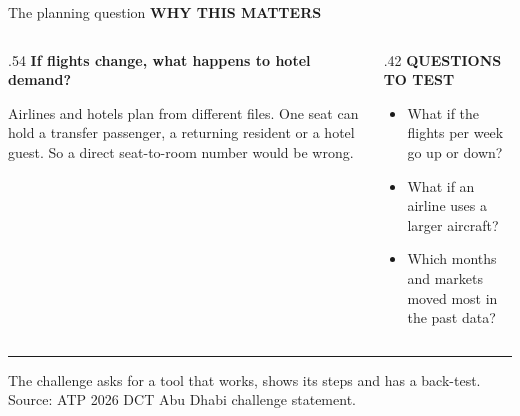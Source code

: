 \documentclass[aspectratio=169,10pt]{beamer}
\newcommand{\kicker}[1]{{\color{Accent}\scriptsize\bfseries\MakeUppercase{#1}}\par\vspace{.16cm}}
\newcommand{\smallnote}[1]{{\color{Muted}\scriptsize #1}}
\begin{document}
\begin{frame}{The planning question}
  \kicker{Why this matters}
  \begin{columns}[T,totalwidth=\linewidth]
    \begin{column}{.54\linewidth}
      {\fontsize{21}{24}\selectfont\bfseries If flights change, what happens to hotel demand?}\par\vspace{.20cm}
      Airlines and hotels plan from different files. One seat can hold a transfer passenger, a returning resident or a hotel guest. So a direct seat-to-room number would be wrong.
    \end{column}
    \begin{column}{.42\linewidth}
      \kicker{Questions to test}
      \begin{itemize}\setlength\itemsep{.16cm}
        \item What if the flights per week go up or down?
        \item What if an airline uses a larger aircraft?
        \item Which months and markets moved most in the past data?
      \end{itemize}
    \end{column}
  \end{columns}
  \vfill
  {\color{Accent}\rule{.07cm}{.45cm}}\hspace{.15cm}%
  \smallnote{The challenge asks for a tool that works, shows its steps and has a back-test. Source: ATP 2026 DCT Abu Dhabi challenge statement.}
\end{frame}
\end{document}
